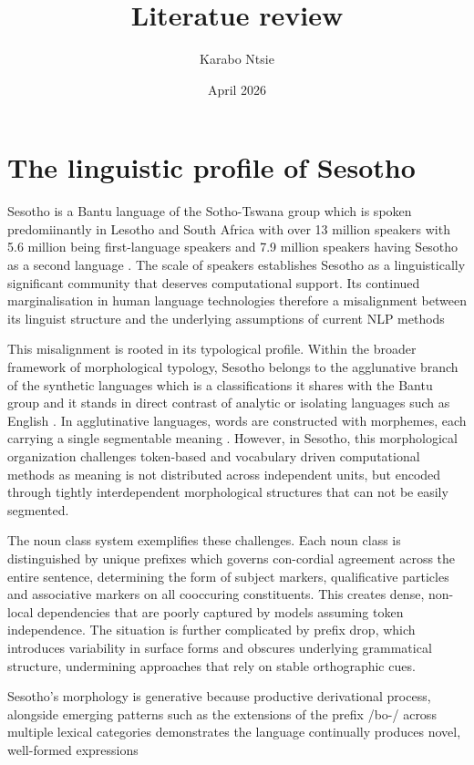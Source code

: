 \documentclass[11pt,a4paper]{article}
\begin{document}
	
\title{Literatue review }
\author{ Karabo Ntsie }
\date { April 2026}
\maketitle  

\section{The linguistic profile of Sesotho}
Sesotho is a Bantu language of the Sotho-Tswana group which is spoken predomiinantly in Lesotho and South Africa with over 13 million speakers with 5.6 million being first-language speakers and 7.9 million speakers having Sesotho as a second language \citep{mokoaleli2020sesotho}. The scale of speakers establishes Sesotho as a linguistically significant community that deserves computational support. Its continued marginalisation in human language technologies therefore a misalignment between its linguist structure and the underlying assumptions of current NLP methods

This misalignment is rooted in its typological profile. Within the broader framework of morphological typology, Sesotho belongs to the agglunative branch of the synthetic languages which is a classifications it shares with the Bantu group and it stands in direct contrast of analytic or isolating languages such as English \citep{kambarami2021out,masethe2022word}. In agglutinative languages, words are constructed with morphemes, each carrying a single segmentable meaning \citep{kambarami2021out}. However, in Sesotho, this morphological organization challenges token-based and vocabulary driven computational methods as meaning is not distributed across independent units, but encoded through tightly interdependent morphological structures that can not be easily segmented. 

The noun class system exemplifies these challenges. Each noun class is distinguished by unique prefixes which governs con-cordial agreement across the entire sentence, determining the form of subject markers, qualificative particles and associative markers on all cooccuring constituents. This creates dense, non-local dependencies that are poorly captured by models assuming token independence. The situation is further complicated by prefix drop, which introduces variability in surface forms and obscures underlying grammatical structure, undermining approaches that rely on stable orthographic cues.

Sesotho's morphology is generative  because productive derivational process, alongside emerging patterns such as the extensions of the prefix /bo-/ across multiple lexical categories demonstrates the language continually produces novel, well-formed expressions \citep{}

  
\end{document}
